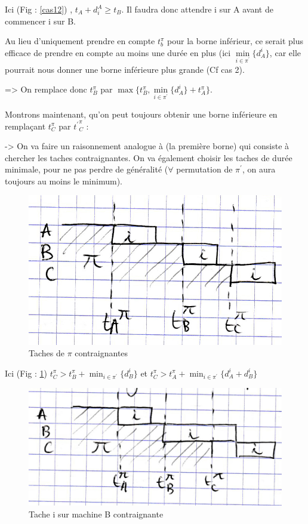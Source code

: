 \documentclass[12pt]{article}
\begin{document}
Ici (Fig : \ref{cas12}) ,  $t_A + d_i^A \ge t_B$. Il faudra donc attendre i sur A avant de commencer i sur B.

Au lieu d'uniquement prendre en compte $t_b^\pi$ pour la borne inférieur, ce serait plus efficace de prendre en compte au moins une durée en plus (ici $\min\limits_{i\in{\pi^\prime}}\{d_A^i\}$, car elle pourrait nous donner une borne inférieure plus grande (Cf cas 2).

=> On remplace donc $t_B^\pi$ par $\max\{t_B^\pi,\min\limits_{i\in{\pi^\prime}}\{d_A^i\}+t_A^\pi\}$.


Montrons maintenant, qu'on peut toujours obtenir une borne inférieure en remplaçant $t_C^\pi$ par ${t^\prime}_C^\pi$ :

-> On va faire un raisonnement analogue à (la première borne) qui consiste à chercher les taches contraignantes. On va également choisir les taches de durée minimale, pour ne pas perdre de généralité ($\forall$ permutation de $\pi^\prime$, on aura toujours au moins le minimum).

\begin{figure}[!ht]
\centering
\centerline{\includegraphics[scale=1]{7.jpg}}
\caption{Taches de $\pi$ contraignantes}
\label{cas21}
\end{figure}

Ici (Fig : \ref{cas21}) $t_C^\pi > t_B^\pi + \displaystyle\min_{i \in \pi^\prime}\{d_B^i\}$ et $t_C^\pi > t_A^\pi + \displaystyle\min_{i \in \pi^\prime}\{d_A^i + d_B^i\}$

\begin{figure}[!ht]
\centering
\centerline{\includegraphics[scale=1]{8.jpg}}
\caption{Tache i sur machine B contraignante}
\label{cas22}
\end{figure}
\end{document}
